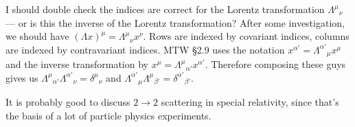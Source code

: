 I should double check the indices are correct for the Lorentz
transformation ${\Lambda^{\mu}}_{\nu}$ --- or is this the inverse of the
Lorentz transformation? After some investigation, we should have
$(\Lambda x)^{\mu} = {\Lambda^{\mu}}_{\nu}x^{\nu}$.
Rows are indexed by covariant indices, columns are indexed by
contravariant indices. MTW \S2.9 uses the notation
$x^{\alpha'} = {\Lambda^{\alpha'}}_{\mu}x^{\mu}$ and the inverse
transformation by $x^{\mu} = {\Lambda^{\mu}}_{\alpha'}x^{\alpha'}$.
Therefore composing these guys gives us
${\Lambda^{\mu}}_{\alpha'}{\Lambda^{\alpha'}}_{\nu}={\delta^{\mu}}_{\nu}$
and ${\Lambda^{\alpha'}}_{\mu}{\Lambda^{\mu}}_{\beta'} = {\delta^{\alpha'}}_{\beta'}$.

It is probably good to discuss $2\to2$ scattering in special relativity,
since that's the basis of a lot of particle physics experiments.
